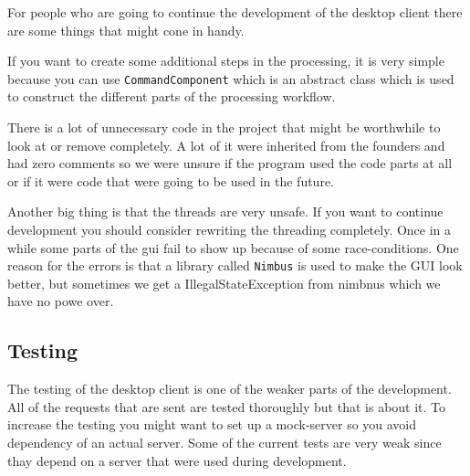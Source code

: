 For people who are going to continue the development of the desktop client there are some things that might cone in handy.

If you want to create some additional steps in the processing, it is very simple because you can use \texttt{CommandComponent} which is an abstract class which is used to construct the different parts of the processing workflow.

There is a lot of unnecessary code in the project that might be worthwhile to look at or remove completely. A lot of it were inherited from the founders and had zero comments so we were unsure if the program used the code parts at all or if it were code that were going to be used in the future.

Another big thing is that the threads are very unsafe. If you want to continue development you should consider rewriting the threading completely. Once in a while some parts of the gui fail to show up because of some race-conditions. One reason for the errors is that a library called \texttt{Nimbus} is used to make the GUI look better, but sometimes we get a IllegalStateException from nimbnus which we have no powe over. 

\subsection{Testing}
The testing of the desktop client is one of the weaker parts of the development. All of the requests that are sent are tested thoroughly but that is about it. To increase the testing you might want to set up a mock-server so you avoid dependency of an actual server. Some of the current tests are very weak since thay depend on a server that were used during development. 
